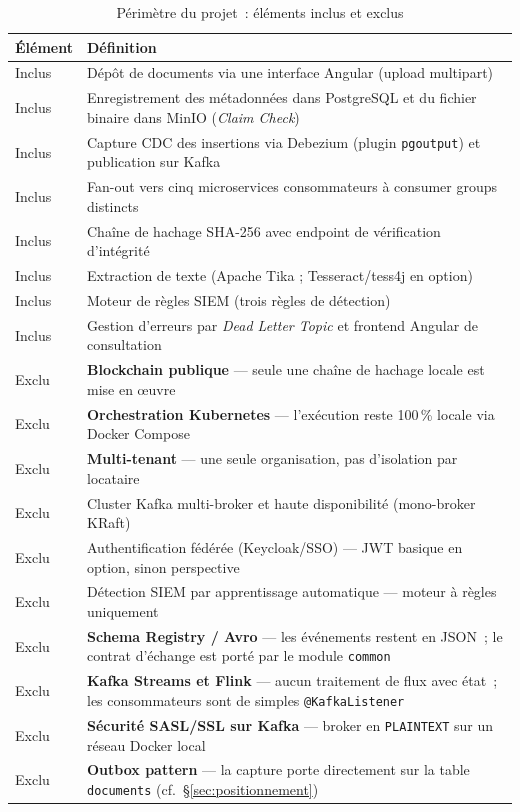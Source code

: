 \documentclass[12pt,a4paper,openany]{report}
\begin{document}
    \begin{table}[H]
    \centering
    \begin{tabularx}{\textwidth}{lX}
    \toprule
    \textbf{\'El\'ement} & \textbf{D\'efinition} \\
    \midrule
    Inclus & D\'ep\^ot de documents via une interface Angular (upload multipart) \\
    Inclus & Enregistrement des m\'etadonn\'ees dans PostgreSQL et du fichier binaire dans MinIO (\emph{Claim Check}) \\
    Inclus & Capture CDC des insertions via Debezium (plugin \texttt{pgoutput}) et publication sur Kafka \\
    Inclus & Fan-out vers cinq microservices consommateurs \`a consumer groups distincts \\
    Inclus & Cha\^ine de hachage SHA-256 avec endpoint de v\'erification d'int\'egrit\'e \\
    Inclus & Extraction de texte (Apache Tika ; Tesseract/tess4j en option) \\
    Inclus & Moteur de r\`egles SIEM (trois r\`egles de d\'etection) \\
    Inclus & Gestion d'erreurs par \emph{Dead Letter Topic} et frontend Angular de consultation \\
    Exclu & \textbf{Blockchain publique} --- seule une cha\^ine de hachage locale est mise en \oe uvre \\
    Exclu & \textbf{Orchestration Kubernetes} --- l'ex\'ecution reste 100\,\% locale via Docker Compose \\
    Exclu & \textbf{Multi-tenant} --- une seule organisation, pas d'isolation par locataire \\
    Exclu & Cluster Kafka multi-broker et haute disponibilit\'e (mono-broker KRaft) \\
    Exclu & Authentification f\'ed\'er\'ee (Keycloak/SSO) --- JWT basique en option, sinon perspective \\
    Exclu & D\'etection SIEM par apprentissage automatique --- moteur \`a r\`egles uniquement \\
    Exclu & \textbf{Schema Registry / Avro} --- les \'ev\'enements restent en JSON~; le contrat d'\'echange est port\'e par le module \texttt{common} \\
    Exclu & \textbf{Kafka Streams et Flink} --- aucun traitement de flux avec \'etat~; les consommateurs sont de simples \texttt{@KafkaListener} \\
    Exclu & \textbf{S\'ecurit\'e SASL/SSL sur Kafka} --- broker en \texttt{PLAINTEXT} sur un r\'eseau Docker local \\
    Exclu & \textbf{Outbox pattern} --- la capture porte directement sur la table \texttt{documents} (cf.~\S\ref{sec:positionnement}) \\
    \bottomrule
    \end{tabularx}
    \caption{P\'erim\`etre du projet~: \'el\'ements inclus et exclus}
    \end{table}
\end{document}
